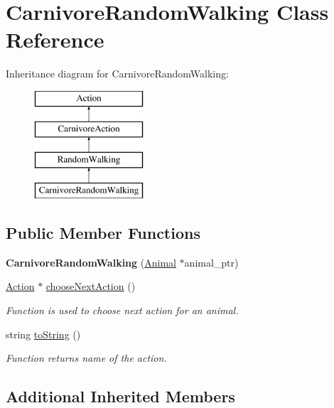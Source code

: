 \hypertarget{class_carnivore_random_walking}{}\section{Carnivore\+Random\+Walking Class Reference}
\label{class_carnivore_random_walking}
Inheritance diagram for Carnivore\+Random\+Walking\+:\begin{figure}[H]
\begin{center}
\leavevmode
\includegraphics[height=4.000000cm]{class_carnivore_random_walking}
\end{center}
\end{figure}
\subsection*{Public Member Functions}
\begin{DoxyCompactItemize}
\item 
\hypertarget{class_carnivore_random_walking_a93f885512562068700bdf324058e142e}{}{\bfseries Carnivore\+Random\+Walking} (\hyperlink{class_animal}{Animal} $\ast$animal\+\_\+ptr)\label{class_carnivore_random_walking_a93f885512562068700bdf324058e142e}

\item 
\hyperlink{class_action}{Action} $\ast$ \hyperlink{class_carnivore_random_walking_ac340cd2cebe482ce2e8a616b347dc9da}{choose\+Next\+Action} ()
\begin{DoxyCompactList}\small\item\em Function is used to choose next action for an animal. \end{DoxyCompactList}\item 
string \hyperlink{class_carnivore_random_walking_ae34e8070f9ac8826bb08141c43adcaf5}{to\+String} ()
\begin{DoxyCompactList}\small\item\em Function returns name of the action. \end{DoxyCompactList}\end{DoxyCompactItemize}
\subsection*{Additional Inherited Members}


